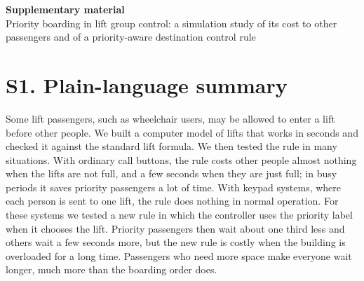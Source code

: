 \documentclass[11pt]{article}
\begin{document}
\begin{center}
{\large\bfseries Supplementary material}\\[4pt]
Priority boarding in lift group control: a simulation study of its cost to other passengers and of a priority-aware destination control rule
\end{center}

\section*{S1. Plain-language summary}
Some lift passengers, such as wheelchair users, may be allowed to enter a lift before other people. We built a computer model of lifts that works in seconds and checked it against the standard lift formula. We then tested the rule in many situations. With ordinary call buttons, the rule costs other people almost nothing when the lifts are not full, and a few seconds when they are just full; in busy periods it saves priority passengers a lot of time. With keypad systems, where each person is sent to one lift, the rule does nothing in normal operation. For these systems we tested a new rule in which the controller uses the priority label when it chooses the lift. Priority passengers then wait about one third less and others wait a few seconds more, but the new rule is costly when the building is overloaded for a long time. Passengers who need more space make everyone wait longer, much more than the boarding order does.
\end{document}
